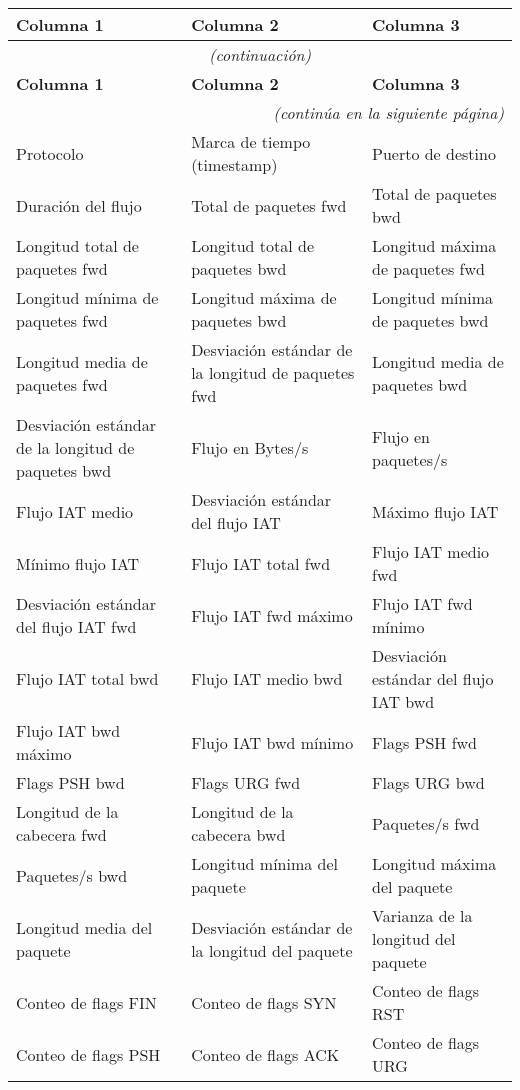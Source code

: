 \begin{longtable}{p{}p{}p{}}
\hline
\textbf{Columna 1} & \textbf{Columna 2} & \textbf{Columna 3} \\
\hline
\endfirsthead
\multicolumn{3}{c}{\small\itshape (continuación)}\\
\hline
\textbf{Columna 1} & \textbf{Columna 2} & \textbf{Columna 3} \\
\hline
\endhead
\hline
\multicolumn{3}{r}{\small\itshape (continúa en la siguiente página)}\\
\endfoot

\endlastfoot
Protocolo  & Marca de tiempo (timestamp) & Puerto de destino \\
Duración del flujo & Total de paquetes fwd & Total de paquetes bwd \\
Longitud total de paquetes fwd & Longitud total de paquetes bwd & Longitud máxima de paquetes fwd \\
Longitud mínima de paquetes fwd & Longitud máxima de paquetes bwd & Longitud mínima de paquetes bwd \\
Longitud media de paquetes fwd & Desviación estándar de la longitud de paquetes fwd & Longitud media de paquetes bwd \\
Desviación estándar de la longitud de paquetes bwd & Flujo en Bytes/s & Flujo en paquetes/s \\
Flujo IAT medio & Desviación estándar del flujo IAT & Máximo flujo IAT \\
Mínimo flujo IAT & Flujo IAT total fwd & Flujo IAT medio fwd \\
Desviación estándar del flujo IAT fwd & Flujo IAT fwd máximo & Flujo IAT fwd mínimo \\
Flujo IAT total bwd & Flujo IAT medio bwd & Desviación estándar del flujo IAT bwd \\
Flujo IAT bwd máximo & Flujo IAT bwd mínimo & Flags PSH fwd \\
Flags PSH bwd & Flags URG fwd & Flags URG bwd \\
Longitud de la cabecera fwd & Longitud de la cabecera bwd & Paquetes/s fwd \\
Paquetes/s bwd & Longitud mínima del paquete & Longitud máxima del paquete \\
Longitud media del paquete & Desviación estándar de la longitud del paquete & Varianza de la longitud del paquete \\
Conteo de flags FIN & Conteo de flags SYN & Conteo de flags RST \\
Conteo de flags PSH & Conteo de flags ACK & Conteo de flags URG \\

\end{longtable}
